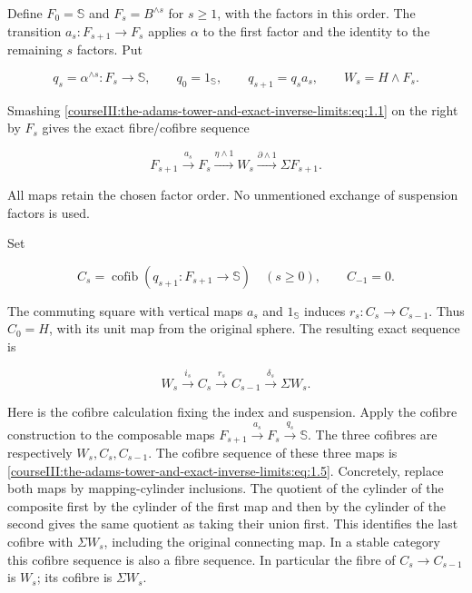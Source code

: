 Define \(F_0=\mathbb S\) and \(F_s=B^{\wedge s}\) for \(s\geq1\), with the factors in this order. The transition \(a_s:F_{s+1}\to F_s\) applies \(\alpha\) to the first factor and the identity to the remaining \(s\) factors. Put

\begin{equation}
q_s=\alpha^{\wedge s}:F_s\longrightarrow\mathbb S,
 \qquad q_0=1_{\mathbb S},\qquad q_{s+1}=q_s a_s,
 \qquad W_s=H\wedge F_s.
 \label{courseIII:the-adams-tower-and-exact-inverse-limits:eq:1.2}
\end{equation}

Smashing \eqref{courseIII:the-adams-tower-and-exact-inverse-limits:eq:1.1} on the right by \(F_s\) gives the exact fibre/cofibre sequence

\begin{equation}
F_{s+1}\xrightarrow{a_s}F_s
 \xrightarrow{\eta\wedge1}W_s
 \xrightarrow{\partial\wedge1}\Sigma F_{s+1}.
 \label{courseIII:the-adams-tower-and-exact-inverse-limits:eq:1.3}
\end{equation}

All maps retain the chosen factor order. No unmentioned exchange of suspension factors is used.

Set

\begin{equation}
C_s=\operatorname{cofib}(q_{s+1}:F_{s+1}\to\mathbb S)
       \quad(s\geq0),\qquad C_{-1}=0.
 \label{courseIII:the-adams-tower-and-exact-inverse-limits:eq:1.4}
\end{equation}

The commuting square with vertical maps \(a_s\) and \(1_{\mathbb S}\) induces \(r_s:C_s\to C_{s-1}\). Thus \(C_0=H\), with its unit map from the original sphere. The resulting exact sequence is

\begin{equation}
W_s\xrightarrow{i_s}C_s\xrightarrow{r_s}C_{s-1}
             \xrightarrow{\delta_s}\Sigma W_s.
 \label{courseIII:the-adams-tower-and-exact-inverse-limits:eq:1.5}
\end{equation}

Here is the cofibre calculation fixing the index and suspension. Apply the cofibre construction to the composable maps
\(F_{s+1}\xrightarrow{a_s}F_s\xrightarrow{q_s}\mathbb S\).
The three cofibres are respectively \(W_s,C_s,C_{s-1}\). The cofibre sequence of these three maps is \eqref{courseIII:the-adams-tower-and-exact-inverse-limits:eq:1.5}. Concretely, replace both maps by mapping-cylinder inclusions. The quotient of the cylinder of the composite first by the cylinder of the first map and then by the cylinder of the second gives the same quotient as taking their union first. This identifies the last cofibre with \(\Sigma W_s\), including the original connecting map. In a stable category this cofibre sequence is also a fibre sequence. In particular the fibre of \(C_s\to C_{s-1}\) is \(W_s\); its cofibre is \(\Sigma W_s\).

